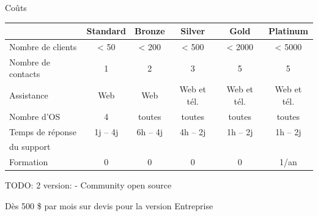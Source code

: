 \documentclass[aspectratio=169]{beamer}
\newcommand{\TODO}{TODO:}
\begin{document}
\begin{frame}{Coûts}
\begin{center}

 \begin{tabular}{|l|ccccc|}
    \hline
    & Standard & Bronze & Silver & Gold & Platinum \\
    \hline
    \hline
    Nombre de clients & < 50 & < 200 & < 500 & < 2000 & < 5000 \\
    \hline
    Nombre de contacts & 1 & 2 & 3 & 5 & 5 \\
    \hline
    Assistance & Web & Web & Web et tél.& Web et tél. & Web et tél. \\
    \hline
    Nombre d'OS & 4 & toutes & toutes & toutes & toutes \\
    \hline
    Temps de réponse & 1j -- 4j & 6h -- 4j & 4h -- 2j & 1h -- 2j & 1h -- 2j \\
    du support &  \\
    \hline
    Formation & 0 & 0 & 0 & 0 & 1/an \\
    \hline
 \end{tabular}
\end{center}

\TODO
2 version: - Community open source

Dès 500 \$ par mois sur devis pour la version Entreprise
\end{frame}
\end{document}
